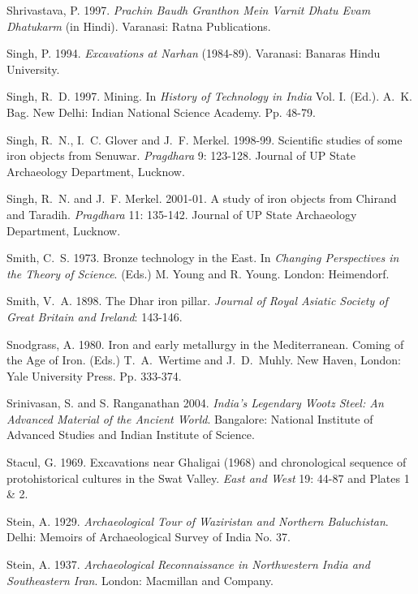 \begin{thebibliography}{99}
 Shrivastava, P. 1997. \textit{Prachin Baudh Granthon Mein Varnit Dhatu Evam Dhatukarm} (in Hindi). Varanasi: Ratna Publications.

 Singh, P. 1994. \textit{Excavations at Narhan} (1984-89). Varanasi: Banaras Hindu University.

 Singh, R.~D. 1997. Mining. In \textit{History of Technology in India} Vol. I. (Ed.). A.~K. Bag. New Delhi: Indian National Science Academy. Pp. 48-79.

 Singh, R.~N., I.~C. Glover and J.~F. Merkel. 1998-99. Scientific studies of some iron objects from Senuwar. \textit{Pragdhara} 9: 123-128. Journal of UP State Archaeology Department, Lucknow. 

 Singh, R.~N. and J.~F. Merkel. 2001-01. A study of iron objects from Chirand and Taradih. \textit{Pragdhara} 11: 135-142. Journal of UP State Archaeology Department, Lucknow.

 Smith, C.~S. 1973. Bronze technology in the East. In \textit{Changing Perspectives in the Theory of Science}. (Eds.) M. Young and R. Young. London: Heimendorf.

 Smith, V.~A. 1898. The Dhar iron pillar. \textit{Journal of Royal Asiatic Society of Great Britain and Ireland}: 143-146. 

 Snodgrass, A. 1980. Iron and early metallurgy in the Mediterranean. Coming of the Age of Iron. (Eds.) T.~A.~Wertime and J.~D.~Muhly. New Haven, London: Yale University Press. Pp. 333-374.

 Srinivasan, S. and S. Ranganathan 2004. \textit{India’s Legendary Wootz Steel: An Advanced Material of the Ancient World}. Bangalore: National Institute of Advanced Studies and Indian Institute of Science.

 Stacul, G. 1969. Excavations near Ghaligai (1968) and chronological sequence of protohistorical cultures in the Swat Valley. \textit{East and West} 19: 44-87 and Plates 1 \& 2. 

 Stein, A. 1929. \textit{Archaeological Tour of Waziristan and Northern Baluchistan}. Delhi: Memoirs of Archaeological Survey of India No. 37. 

 Stein, A. 1937. \textit{Archaeological Reconnaissance in Northwestern India and Southeastern Iran}. London: Macmillan and Company.


\end{thebibliography}
